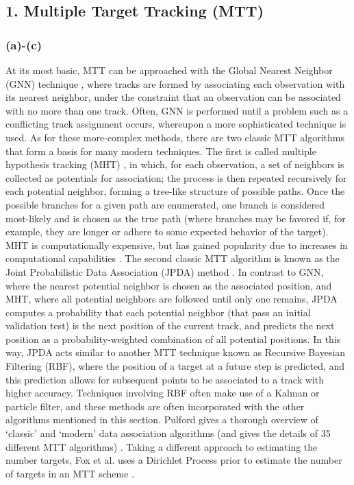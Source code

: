 \documentclass{article}
\begin{document}
\subsection*{1. Multiple Target Tracking (MTT)}

\subsubsection*{(a)-(c)}
At its most basic, MTT can be approached with the Global Nearest Neighbor (GNN) technique \citep{blackman_2004}, where tracks are formed by associating each observation with its nearest neighbor, under the constraint that an observation can be associated with no more than one track. Often, GNN is performed until a problem such as a conflicting track assignment occurs, whereupon a more sophisticated technique is used. As for these more-complex methods, there are two classic MTT algorithms that form a basis for many modern techniques. The first is called multiple hypothesis tracking (MHT) \citep{singer_1974, reid_1979, blackman_2004}, in which, for each observation, a set of neighbors is collected as potentials for association; the process is then repeated recursively for each potential neighbor, forming a tree-like structure of possible paths. Once the possible branches for a given path are enumerated, one branch is considered most-likely and is chosen as the true path (where branches may be favored if, for example, they are longer or adhere to some expected behavior of the target). MHT is computationally expensive, but has gained popularity due to increases in computational capabilities \citep{blackman_2004}. The second classic MTT algorithm is known as the Joint Probabilistic Data Association (JPDA) method \citep{barshalom_1975, kirubarajan_2004}. In contrast to GNN, where the nearest potential neighbor is chosen as the associated position, and MHT, where all potential neighbors are followed until only one remains, JPDA computes a probability that each potential neighbor (that pass an initial validation test) is the next position of the current track, and predicts the next position as a probability-weighted combination of all potential positions. In this way, JPDA acts similar to another MTT technique known as Recursive Bayesian Filtering (RBF), where the position of a target at a future step is predicted, and this prediction allows for subsequent points to be associated to a track with higher accuracy. Techniques involving RBF often make use of a Kalman or particle filter, and these methods are often incorporated with the other algorithms mentioned in this section. Pulford gives a thorough overview of `classic' and `modern' data association algorithms (and gives the details of 35 different MTT algorithms) \citep{pulford_2005}. Taking a different approach to estimating the number targets, Fox et al. uses a Dirichlet Process prior to estimate the number of targets in an MTT scheme \citep{fox_2006}.
\end{document}
